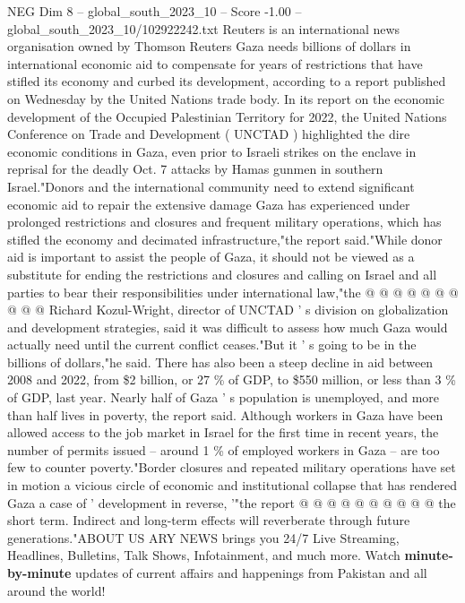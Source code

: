 \begin{textsample}{NEG Dim 8 – global\_south\_2023\_10 – Score -1.00 – global\_south\_2023\_10/102922242.txt}  \label{ex:f8_neg_095}
Reuters is an international news organisation owned by Thomson Reuters Gaza needs billions of dollars in international economic aid to compensate for years of restrictions that have stifled its economy and curbed its development, according to a report published on Wednesday by the United Nations trade body.
In its report on the economic development of the Occupied Palestinian Territory for 2022, the United Nations Conference on Trade and Development ( UNCTAD ) highlighted the dire economic conditions in Gaza, even prior to Israeli strikes on the enclave in reprisal for the deadly Oct. 7 attacks by Hamas gunmen in southern Israel."Donors and the international community need to extend significant economic aid to repair the extensive damage Gaza has experienced under prolonged restrictions and closures and frequent military operations, which has stifled the economy and decimated infrastructure,"the report said."While donor aid is important to assist the people of Gaza, it should not be viewed as a substitute for ending the restrictions and closures and calling on Israel and all parties to bear their responsibilities under international law,"the @ @ @ @ @ @ @ @ @ @ Richard Kozul-Wright, director of UNCTAD ' s division on globalization and development strategies, said it was difficult to assess how much Gaza would actually need until the current conflict ceases."But it ' s going to be in the billions of dollars,"he said.
There has also been a steep decline in aid between 2008 and 2022, from \$2 billion, or 27 \% of GDP, to \$550 million, or less than 3 \% of GDP, last year.
Nearly half of Gaza ' s population is unemployed, and more than half lives in poverty, the report said.
Although workers in Gaza have been allowed access to the job market in Israel for the first time in recent years, the number of permits issued -- around 1 \% of employed workers in Gaza -- are too few to counter poverty."Border closures and repeated military operations have set in motion a vicious circle of economic and institutional collapse that has rendered Gaza a case of ' development in reverse, '"the report @ @ @ @ @ @ @ @ @ @ the short term.
Indirect and long-term effects will reverberate through future generations."ABOUT US ARY NEWS brings you 24/7 Live Streaming, Headlines, Bulletins, Talk Shows, Infotainment, and much more.
Watch \textbf{minute-by-minute} updates of current affairs and happenings from Pakistan and all around the world!

\end{textsample}
